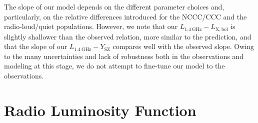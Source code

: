 \documentclass[traditabstract]{aa}
\newcommand{\rmn}{\mathrm}
\begin{document}
The slope of our model depends on the different parameter choices and,
particularly, on the relative differences introduced for the NCCC/CCC and the
radio-loud/quiet populations. However, we note that our
$L_{1.4~\rmn{GHz}}-L_{\rmn{X,bol}}$ is slightly shallower than the observed
relation, more similar to the \cite{2009JCAP...09..024K} prediction, and that
the slope of our $L_{1.4~\rmn{GHz}}-Y_{\rmn{SZ}}$ compares well with the
observed slope. Owing to the many uncertainties and lack of robustness both in
the observations and modeling at this stage, we do not attempt to fine-tune our
model to the observations.


\section{Radio Luminosity Function}
\label{sec:5}
\end{document}
